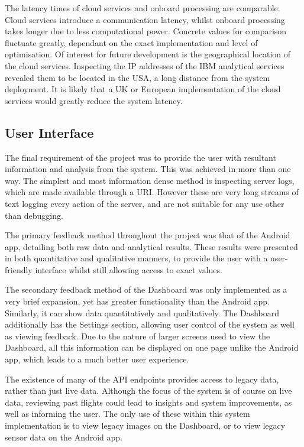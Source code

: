 \documentclass{article}
\begin{document}
The latency times of cloud services and onboard processing are comparable. Cloud services introduce a communication latency, whilst onboard processing takes longer due to less computational power. Concrete values for comparison fluctuate greatly, dependant on the exact implementation and level of optimisation. Of interest for future development is the geographical location of the cloud services. Inspecting the IP addresses of the IBM analytical services revealed them to be located in the USA, a long distance from the system deployment. It is likely that a UK or European implementation of the cloud services would greatly reduce the system latency.


\subsection{User Interface}
The final requirement of the project was to provide the user with resultant information and analysis from the system. This was achieved in more than one way. The simplest and most information dense method is inspecting server logs, which are made available through a URI. However these are very long streams of text logging every action of the server, and are not suitable for any use other than debugging. 

The primary feedback method throughout the project was that of the Android app, detailing both raw data and analytical results. These results were presented in both quantitative and qualitative manners, to provide the user with a user-friendly interface whilst still allowing access to exact values.

The secondary feedback method of the Dashboard was only implemented as a very brief expansion, yet has greater functionality than the Android app. Similarly, it can show data quantitatively and qualitatively. The Dashboard additionally has the Settings section, allowing user control of the system as well as viewing feedback. Due to the nature of larger screens used to view the Dashboard, all this information can be displayed on one page unlike the Android app, which leads to a much better user experience. 

The existence of many of the API endpoints provides access to legacy data, rather than just live data. Although the focus of the system is of course on live data, reviewing past flights could lead to insights and system improvements, as well as informing the user. The only use of these within this system implementation is to view legacy images on the Dashboard, or to view legacy sensor data on the Android app.  
\end{document}
